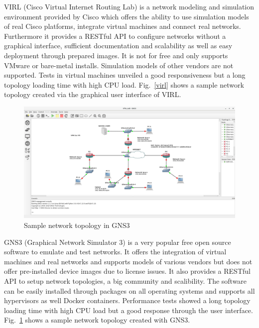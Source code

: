 \documentclass[conference]{IEEEtran}
\begin{document}
VIRL (Cisco Virtual Internet Routing Lab) is a network modeling and simulation environment provided by Cisco which offers the ability to use simulation models of real Cisco platforms, integrate virtual machines and connect real networks. Furthermore it provides a RESTful API to configure networks without a graphical interface, sufficient documentation and scalability as well as easy deployment through prepared images. It is not for free and only supports VMware or bare-metal installs. Simulation models of other vendors are not supported. Tests in virtual machines unveiled a good responsiveness but a long topology loading time with high CPU load. Fig.~\ref{virl} shows a sample network topology created via the graphical user interface of VIRL.  \cite{b1} \cite{b3}

\begin{figure}[htbp]
\centerline{\includegraphics[scale=0.13]{gns3.png}}
\caption{Sample network topology in GNS3 \cite{b4}}
\label{gns3}
\end{figure}

GNS3 (Graphical Network Simulator 3) is a very popular free open source software to emulate and test networks. It offers the integration of virtual machines and real networks and supports models of various vendors but does not offer pre-installed device images due to license issues. It also provides a RESTful API to setup network topologies, a big community and scalibility. The software can be easily installed through packages on all operating systems and supports all hypervisors as well Docker containers. Performance tests showed a long topology loading time with high CPU load but a good response through the user interface. Fig.~\ref{gns3} shows a sample network topology created with GNS3.  \cite{b1} \cite{b5}
\end{document}
